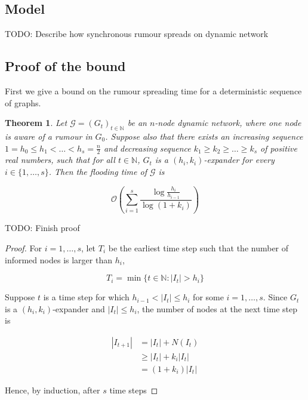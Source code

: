 \documentclass[a4paper,11pt]{article}
\newtheorem{theorem}{Theorem}[section]
\theoremstyle{definition}
\newcommand{\ModelIntro}{
	Let $\mathcal{G} = (G_t)_{t \in \mathbb{N}}$ be an $n$-node dynamic network, where one node is aware of a rumour in $G_0$.
}
\begin{document}
\subsection{Model}

TODO: Describe how synchronous rumour spreads on dynamic network

\subsection{Proof of the bound}

First we give a bound on the rumour spreading time for a deterministic sequence of graphs. 

\begin{theorem}
	\ModelIntro Suppose also that there exists an increasing sequence $1 = h_0 \leq h_1 < \dots < h_s = \frac{n}{2}$ and decreasing sequence $k_1 \geq k_2 \geq \dots \geq k_s$ of positive real numbers, such that for all $t \in \mathbb{N}$, $G_t$ is a $(h_i, k_i)$-expander for every $i \in \{1, \dots , s\}$. Then the flooding time of $\mathcal{G}$ is

	$$
		\mathcal{O}\left(\sum_{i=1}^s \frac{\log \frac{h_i}{h_{i-1}}}{\log(1+k_i)}\right)
	$$
\end{theorem}

TODO: Finish proof

\begin{proof}
	For $i = 1,\dots, s$, let $T_i$ be the earliest time step such that the number of informed nodes is larger than $h_i$,

	$$
		T_i = \min \{ t \in \mathbb{N} : |I_t| > h_i \}
	$$

	Suppose $t$ is a time step for which $h_{i-1} < |I_t| \leq h_i$ for some $i = 1,\dots, s$. Since $G_t$ is a $(h_i, k_i)$-expander and $|I_t| \leq h_i$, the number of nodes at the next time step is 
	
	\begin{align*}
		|I_{t+1}| &= |I_t| + N(I_t) \\
		& \geq |I_t| + k_i |I_t| \\
		& = (1 + k_i)|I_t|
	\end{align*}

	Hence, by induction, after $s$ time steps



\end{proof}
\end{document}
